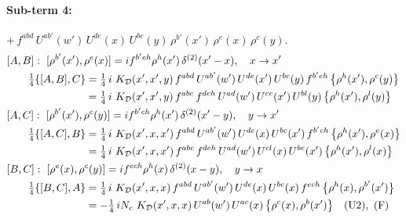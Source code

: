 \documentclass[10pt]{article}
\numberwithin{equation}{section}
\begin{document}
\paragraph{Sub-term 4:} $+\,f^{abd}\,U^{ab'}(w')\,U^{de}(x)\,U^{bc}(y)\,\rho^{b'}(x')\,\rho^{e}(x)\,\rho^{c}(y)$.
\begin{align}
&[A,B]:\ [\rho^{b'}(x'),\rho^{e}(x)]=i f^{b'eh}\rho^{h}(x')\,\delta^{(2)}(x'-x),\quad x\to x'\notag\\
&\qquad \tfrac14\{[A,B],C\}=\tfrac14\,i\,\,K_{\mathcal D}(x',x',y)\,f^{abd}\,U^{ab'}(w')\,U^{de}(x')\,U^{bc}(y)\,f^{b'eh}\,\big\{\rho^{h}(x'),\rho^{c}(y)\big\}\notag\\
&\qquad\phantom{\tfrac14\{[A,B],C\}}=\tfrac14\,i\,\,K_{\mathcal D}(x',x',y)\,f^{abc}\,f^{deh}\,U^{ad}(w')\,U^{ce}(x')\,U^{bl}(y)\,\big\{\rho^{h}(x'),\rho^{l}(y)\big\}
\label{T:eq:D-4-AB}\\
&[A,C]:\ [\rho^{b'}(x'),\rho^{c}(y)]=i f^{b'ch}\rho^{h}(x')\,\delta^{(2)}(x'-y),\quad y\to x'\notag\\
&\qquad \tfrac14\{[A,C],B\}=\tfrac14\,i\,\,K_{\mathcal D}(x',x,x')\,f^{abd}\,U^{ab'}(w')\,U^{de}(x)\,U^{bc}(x')\,f^{b'ch}\,\big\{\rho^{h}(x'),\rho^{e}(x)\big\}\notag\\
&\qquad\phantom{\tfrac14\{[A,C],B\}}=\tfrac14\,i\,\,K_{\mathcal D}(x',x,x')\,f^{abc}\,f^{deh}\,U^{ad}(w')\,U^{cl}(x)\,U^{be}(x')\,\big\{\rho^{h}(x'),\rho^{l}(x)\big\}
\label{T:eq:D-4-AC}\\
&[B,C]:\ [\rho^{e}(x),\rho^{c}(y)]=i f^{ech}\rho^{h}(x)\,\delta^{(2)}(x-y),\quad y\to x\notag\\
&\qquad \tfrac14\{[B,C],A\}=\tfrac14\,i\,\,K_{\mathcal D}(x',x,x)\,f^{abd}\,U^{ab'}(w')\,U^{de}(x)\,U^{bc}(x)\,f^{ech}\,\big\{\rho^{h}(x),\rho^{b'}(x')\big\}\notag\\
&\qquad\phantom{\tfrac14\{[B,C],A\}}=-\tfrac14\,i N_{c}\,\,K_{\mathcal D}(x',x,x)\,U^{ab}(w')\,U^{ac}(x)\,\big\{\rho^{c}(x),\rho^{b}(x')\big\}\quad\text{(U2)},\ \text{(F)}
\label{T:eq:D-4-BC}
\end{align}
\end{document}
